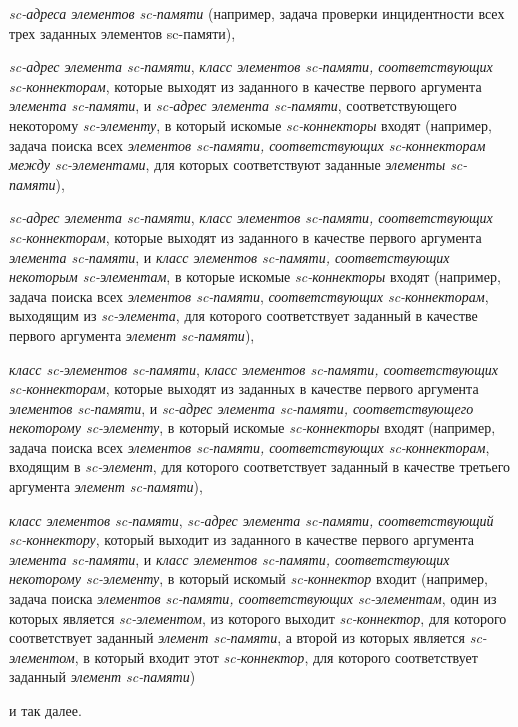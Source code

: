 \begin{textitemize}
	\item \textit{sc-адреса элементов sc-памяти} (например, задача проверки инцидентности всех трех заданных элементов sc-памяти),
	\item \textit{sc-адрес элемента sc-памяти}, \textit{класс элементов sc-памяти, соответствующих sc-коннекторам\scnsupergroupsign}, которые выходят из заданного в качестве первого аргумента \textit{элемента sc-памяти}, и \textit{sc-адрес элемента sc-памяти}, соответствующего некоторому \textit{sc-элементу}, в который искомые \textit{sc-коннекторы} входят (например, задача поиска всех \textit{элементов sc-памяти, соответствующих sc-коннекторам между sc-элементами}, для которых соответствуют заданные \textit{элементы sc-памяти}),
	\item \textit{sc-адрес элемента sc-памяти}, \textit{класс элементов sc-памяти, соответствующих sc-коннекторам\scnsupergroupsign}, которые выходят из заданного в качестве первого аргумента \textit{элемента sc-памяти}, и \textit{класс элементов sc-памяти, соответствующих некоторым sc-элементам\scnsupergroupsign}, в которые искомые \textit{sc-коннекторы} входят (например, задача поиска всех \textit{элементов sc-памяти}, \textit{соответствующих sc-коннекторам}, выходящим из \textit{sc-элемента}, для которого соответствует заданный в качестве первого аргумента \textit{элемент sc-памяти}),
	\item \textit{класс sc-элементов sc-памяти\scnsupergroupsign}, \textit{класс элементов sc-памяти, соответствующих sc-коннекторам\scnsupergroupsign}, которые выходят из заданных в качестве первого аргумента \textit{элементов sc-памяти}, и \textit{sc-адрес элемента sc-памяти, соответствующего некоторому sc-элементу}, в который искомые \textit{sc-коннекторы} входят (например, задача поиска всех \textit{элементов sc-памяти, соответствующих sc-коннекторам}, входящим в \textit{sc-элемент}, для которого соответствует заданный в качестве третьего аргумента \textit{элемент sc-памяти}),
	\item \textit{класс элементов sc-памяти\scnsupergroupsign}, \textit{sc-адрес элемента sc-памяти, соответствующий sc-коннектору}, который выходит из заданного в качестве первого аргумента \textit{элемента sc-памяти}, и \textit{класс элементов sc-памяти, соответствующих некоторому sc-элементу\scnsupergroupsign}, в который искомый \textit{sc-коннектор} входит (например, задача поиска \textit{элементов sc-памяти, соответствующих sc-элементам}, один из которых является \textit{sc-элементом}, из которого выходит \textit{sc-коннектор}, для которого соответствует заданный \textit{элемент sc-памяти}, а второй из которых является \textit{sc-элементом}, в который входит этот \textit{sc-коннектор}, для которого соответствует заданный \textit{элемент sc-памяти})
	\item и так далее.
\end{textitemize}
			
